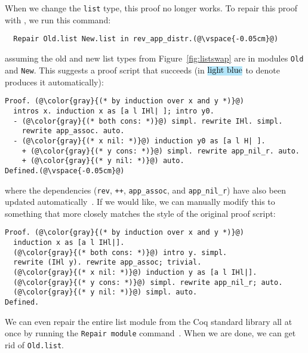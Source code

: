 When we change the \lstinline{list} type, this proof no longer works.
To repair this proof with \toolnamec, we run this command:

\begin{lstlisting}
  Repair Old.list New.list in rev_app_distr.(@\vspace{-0.05cm}@)
\end{lstlisting}
assuming the old and new list types from Figure~\ref{fig:listswap} are in modules \lstinline{Old} and \lstinline{New}.
This suggests a proof script that succeeds (in $\codeauto{light blue}$ to denote \toolnamec produces it automatically):

\begin{lstlisting}[backgroundcolor=\color{cyan!30}]
Proof. (@\color{gray}{(* by induction over x and y *)}@)
  intros x. induction x as [a l IHl| ]; intro y0.
  - (@\color{gray}{(* both cons: *)}@) simpl. rewrite IHl. simpl.
    rewrite app_assoc. auto.
  - (@\color{gray}{(* x nil: *)}@) induction y0 as [a l H| ].
    + (@\color{gray}{(* y cons: *)}@) simpl. rewrite app_nil_r. auto.
    + (@\color{gray}{(* y nil: *)}@) auto.
Defined.(@\vspace{-0.05cm}@)
\end{lstlisting}
where the dependencies (\lstinline{rev}, \lstinline{++}, \lstinline{app_assoc}, and \lstinline{app_nil_r}) have
also been updated automatically~\href{https://github.com/uwplse/pumpkin-pi/blob/v2.0.0/plugin/coq/Swap.v}{}. %
If we would like, we can manually modify this to something that more closely matches the style of the original proof script:

\begin{lstlisting}
Proof. (@\color{gray}{(* by induction over x and y *)}@)
  induction x as [a l IHl|].
  (@\color{gray}{(* both cons: *)}@) intro y. simpl.
  rewrite (IHl y). rewrite app_assoc; trivial.
  (@\color{gray}{(* x nil: *)}@) induction y as [a l IHl|].
  (@\color{gray}{(* y cons: *)}@) simpl. rewrite app_nil_r; auto.
  (@\color{gray}{(* y nil: *)}@) simpl. auto.
Defined.
\end{lstlisting}
We can even repair the entire list module from the Coq standard library all at once by running the \lstinline{Repair module}
command~\href{https://github.com/uwplse/pumpkin-pi/blob/v2.0.0/plugin/coq/Swap.v}{}. %
When we are done, we can get rid of \lstinline{Old.list}. %

